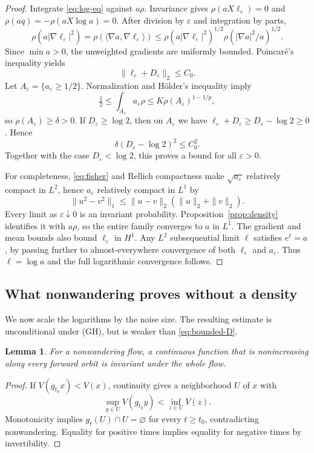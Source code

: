 \documentclass[11pt]{article}
\newtheorem{lemma}[theorem]{Lemma}
\theoremstyle{definition}
\theoremstyle{remark}
\newcommand{\eps}{\varepsilon}
\begin{document}
\begin{proof}
Integrate \eqref{eq:log-eq} against $a\rho$. Invariance gives $\rho(aX\ell_\eps)=0$ and $\rho(aq)=-\rho(aX\log a)=0$. After division by $\eps$ and integration by parts,
\[
 \rho(a|\nabla\ell_\eps|^2)=\rho(\langle\nabla a,\nabla\ell_\eps\rangle)
 \le\rho(a|\nabla\ell_\eps|^2)^{1/2}
       \rho(|\nabla a|^2/a)^{1/2}.
\]
Since $\min a>0$, the unweighted gradients are uniformly bounded. Poincar\'e's inequality yields
\[
 \|\ell_\eps+D_\eps\|_2\le C_0.
\]
Let $A_\eps=\{a_\eps\ge1/2\}$. Normalization and H\"older's inequality imply
\[
 \tfrac12\le\int_{A_\eps}a_\eps\rho
 \le K\rho(A_\eps)^{1-1/p},
\]
so $\rho(A_\eps)\ge\delta>0$. If $D_\eps\ge\log2$, then on $A_\eps$ we have $\ell_\eps+D_\eps\ge D_\eps-\log2\ge0$. Hence
\[
 \delta(D_\eps-\log2)^2\le C_0^2.
\]
Together with the case $D_\eps<\log2$, this proves a bound for all $\eps>0$.

For completeness, \eqref{eq:fisher} and Rellich compactness make $\sqrt{a_\eps}$ relatively compact in $L^2$, hence $a_\eps$ relatively compact in $L^1$ by
\[
 \|u^2-v^2\|_1\le\|u-v\|_2(\|u\|_2+\|v\|_2).
\]
Every limit as $\eps\downarrow0$ is an invariant probability. Proposition~\ref{prop:density} identifies it with $a\rho$, so the entire family converges to $a$ in $L^1$. The gradient and mean bounds also bound $\ell_\eps$ in $H^1$. Any $L^2$ subsequential limit $\ell$ satisfies $e^\ell=a$, by passing further to almost-everywhere convergence of both $\ell_\eps$ and $a_\eps$. Thus $\ell=\log a$ and the full logarithmic convergence follows.
\end{proof}

\subsection{What nonwandering proves without a density}

We now scale the logarithms by the noise size. The resulting estimate is unconditional under (GH), but is weaker than \eqref{eq:bounded-D}.

\begin{lemma}\label{lem:Lyapunov}
For a nonwandering flow, a continuous function that is nonincreasing along every forward orbit is invariant under the whole flow.
\end{lemma}


\begin{proof}
If $V(g_{t_0}x)<V(x)$, continuity gives a neighborhood $U$ of $x$ with
\[
 \sup_{y\in U}V(g_{t_0}y)<\inf_{z\in U}V(z).
\]
Monotonicity implies $g_t(U)\cap U=\varnothing$ for every $t\ge t_0$, contradicting nonwandering. Equality for positive times implies equality for negative times by invertibility.
\end{proof}
\end{document}
